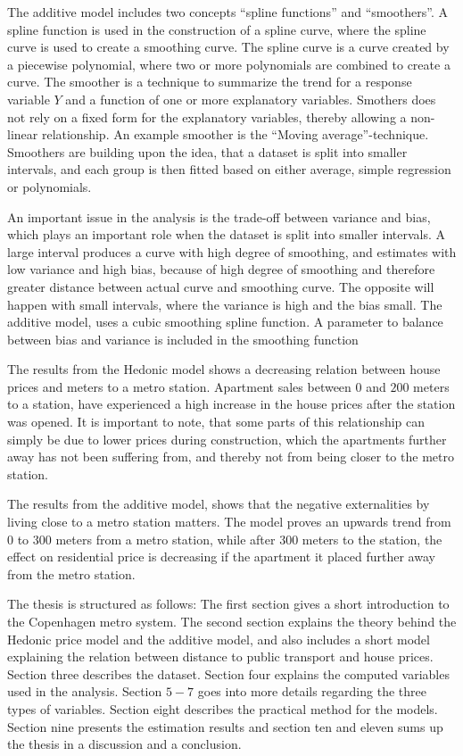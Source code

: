 The additive model includes two concepts ``spline functions'' and ``smoothers''.  
A spline function is used in the construction of a spline curve, where the 
spline curve is used to create a smoothing curve. The spline curve is a curve 
created by a piecewise polynomial, where two or more polynomials are combined 
to create a curve. The smoother is a technique to summarize the trend for a 
response variable $Y$ and a function of one or more explanatory variables. 
Smothers does not rely on a fixed form for the explanatory variables, thereby 
allowing a non-linear relationship. An example smoother is the 
``Moving average''-technique. Smoothers are building upon the idea, that a 
dataset is split into smaller intervals, and each group is then fitted based on
either average, simple regression or polynomials.

An important issue in the analysis is the trade-off between variance and 
bias, which plays an important role when the dataset is split into smaller 
intervals. A large interval produces a curve with high degree of smoothing, 
and estimates with low variance and high bias, because of high degree of 
smoothing and therefore greater distance between actual curve and smoothing 
curve.  The opposite will happen with small intervals, where the variance is 
high and the bias small.  The additive model, uses a cubic smoothing spline 
function. A parameter to balance between bias and variance is included in the 
smoothing function

The results from the Hedonic model shows a decreasing relation between house prices and 
meters to a metro station. Apartment sales between $0$ and $200$ meters to a 
station, have experienced a high increase in the house prices after the 
station was opened. It is important to note, that some parts of this 
relationship can simply be due to lower prices during construction, which the 
apartments further away has not been suffering from, and thereby not from being
closer to the metro station.

The results from the additive model, shows that the negative externalities by 
living close to a metro station matters. The model proves an upwards trend 
from $0$ to $300$ meters from a metro station, while after $300$ meters to the station, 
the effect on residential price is decreasing if the apartment it placed further away 
from the metro station.   

The thesis is structured as follows: The first section gives a short
introduction to the Copenhagen metro system. The second section explains the 
theory behind the Hedonic price model and the additive model, and also includes
a short model explaining the relation between distance to public transport and
house prices. Section three describes the dataset. Section four explains the 
computed variables used in the analysis. Section $5-7$ goes into more details regarding the three 
types of variables. Section eight describes the practical method for the models. 
Section nine presents the estimation results and section ten and eleven 
sums up the thesis in a discussion and a conclusion. 
